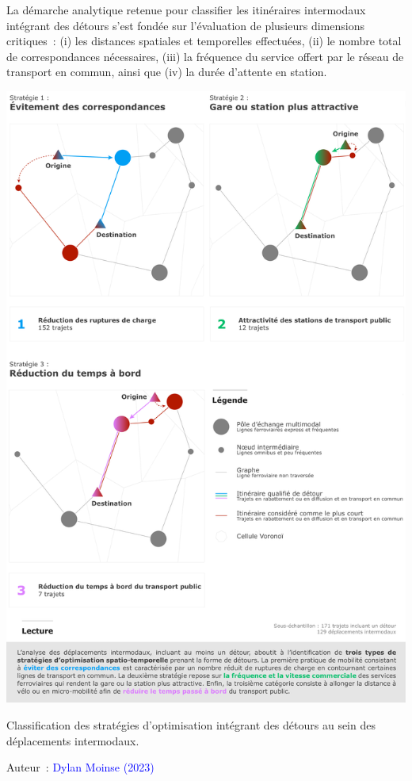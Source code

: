 \begin{refsegment}
La démarche analytique retenue pour classifier les itinéraires intermodaux intégrant des détours s'est fondée sur l'évaluation de plusieurs dimensions critiques~: (i) les distances spatiales et temporelles effectuées, (ii) le nombre total de correspondances nécessaires, (iii) la fréquence du service offert par le réseau de transport en commun, ainsi que (iv) la durée d'attente en station.%

    \begin{carte}[h!]\vspace*{4pt}
        \centerline{\includegraphics[width=1\columnwidth]{src/Figures/Chap-5/FR_Detours_Typologie.pdf}}
        \caption{Classification des stratégies d'optimisation intégrant des détours au sein des déplacements intermodaux.}
        \label{fig-chap5:classification-strategies-optimisation-detours}
        \vspace{5pt}
        \begin{flushright}\scriptsize{
        Auteur~: \textcolor{blue}{Dylan Moinse (2023)}
        }\end{flushright}
    \end{carte}


\end{refsegment}
